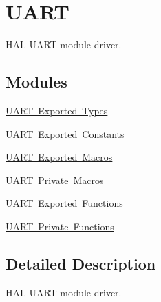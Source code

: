 \hypertarget{group___u_a_r_t}{}\section{U\+A\+RT}
\label{group___u_a_r_t}


H\+AL U\+A\+RT module driver.  


\subsection*{Modules}
\begin{DoxyCompactItemize}
\item 
\mbox{\hyperlink{group___u_a_r_t___exported___types}{U\+A\+R\+T Exported Types}}
\item 
\mbox{\hyperlink{group___u_a_r_t___exported___constants}{U\+A\+R\+T Exported Constants}}
\item 
\mbox{\hyperlink{group___u_a_r_t___exported___macros}{U\+A\+R\+T Exported Macros}}
\item 
\mbox{\hyperlink{group___u_a_r_t___private___macros}{U\+A\+R\+T Private Macros}}
\item 
\mbox{\hyperlink{group___u_a_r_t___exported___functions}{U\+A\+R\+T Exported Functions}}
\item 
\mbox{\hyperlink{group___u_a_r_t___private___functions}{U\+A\+R\+T Private Functions}}
\end{DoxyCompactItemize}


\subsection{Detailed Description}
H\+AL U\+A\+RT module driver. 

